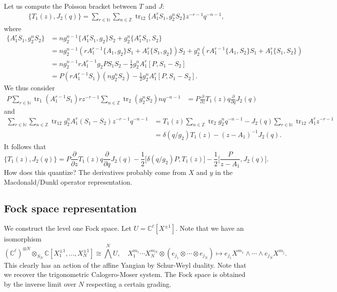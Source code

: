 \documentclass[11pt]{report}
\theoremstyle{definition}
\theoremstyle{remark}
\theoremstyle{remark}
\newcommand{\N}{\mathbb{N}}
\newcommand{\Z}{\mathbb{Z}}
\newcommand{\C}{\mathbb{C}}
\begin{document}
Let us compute the Poisson bracket between $T$ and $J$:
\begin{align*}
\{ T_1(z), J_2(q) \} = \sum_{r \in \N} \sum_{n \in \Z} \operatorname{tr}_{12} \{ A_1^r S_1, g_2^n S_2 \} z^{-r-1} q^{-n-1},
\end{align*}
where
\begin{align*}
\{ A_1^r S_1, g_2^n S_2 \}
&= n g_2^{n-1} \{ A_1^r S_1, g_2 \} S_2 + g_2^n \{ A_1^r S_1, S_2 \} \\
&= n g_2^{n-1} (r A_1^{r-1} \{ A_1, g_2 \} S_1 + A_1^r \{ S_1, g_2 \}) S_2 + g_2^n (r A_1^{r-1} \{ A_1, S_2 \} S_1 + A_1^r \{ S_1, S_2 \}) \\
&= n g_2^{n-1} r A_1^{r-1} g_2 P S_1 S_2 - \tfrac{1}{2} g_2^n A_1^r [P,S_1-S_2] \\
&= P (r A_1^{r-1} S_1) (n g_2^n S_2) - \tfrac{1}{2} g_2^n A_1^r [P,S_1-S_2].
\end{align*}
We thus consider
\begin{align*}
P \sum_{r \in \N} \operatorname{tr}_1(A_1^{r-1} S_1) r z^{-r-1} \sum_{n \in \Z} \operatorname{tr}_2(g_2^n S_2) n q^{-n-1}
&= P \frac{\partial}{\partial z} T_1(z) q \frac{\partial}{\partial q} J_2(q)
\end{align*}
and
\begin{align*}
\sum_{r \in \N} \sum_{n \in \Z} \operatorname{tr}_{12} g_2^n A_1^r (S_1-S_2) z^{-r-1} q^{-n-1}
&= T_1(z) \sum_{n \in \Z} \operatorname{tr}_2 g_2^n q^{-n-1} - J_2(q) \sum_{r \in \N} \operatorname{tr}_{12} A_1^r z^{-r-1} \\
&= \delta(q/g_2) T_1(z) - (z-A_1)^{-1} J_2(q).
\end{align*}
It follows that
\begin{equation*}
\{ T_1(z), J_2(q) \} = P \frac{\partial}{\partial z} T_1(z) q \frac{\partial}{\partial q} J_2(q) - \frac{1}{2} \bigg[ \delta(q/g_2) P, T_1(z) \bigg] - \frac{1}{2} \bigg[ \frac{P}{z-A_1},J_2(q) \bigg].
\end{equation*}
How does this quantize? The derivatives probably come from $X$ and $y$ in the Macdonald/Dunkl operator representation.

\subsection{Fock space representation}

\cite{article:kodera:2016}

We construct the level one Fock space. Let $U = \C^\ell[X^{\pm 1}]$. Note that we have an isomorphism
\begin{equation*}
(\C^\ell)^{\otimes N} \otimes_{S_N} \C[X_1^{\pm 1},...,X_N^{\pm 1}] \cong \bigwedge^N U, \quad X_1^{m_1} \cdots X_N^{m_N} \otimes (e_{j_1} \otimes \cdots \otimes e_{j_N}) \mapsto e_{j_1} X^{m_1} \wedge \cdots \wedge e_{j_N} X^{m_j}.
\end{equation*}
This clearly has an action of the affine Yangian by Schur-Weyl duality. Note that we recover the trigonometric Calogero-Moser system. The Fock space is obtained by the inverse limit over $N$ respecting a certain grading.
\end{document}
